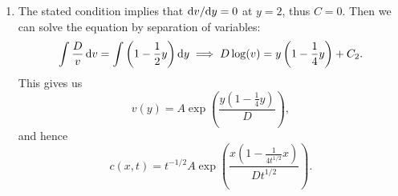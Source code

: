 \documentclass[a4paper, 12pt]{article}
\begin{document}
\begin{enumerate}[label={\bf \arabic{*}.\;}, ref={\arabic{*}},itemsep=3ex, left=0ex]
{\begin{enumerate}[label=(\alph*)]
{          }
        \item{The stated condition implies that $\fd{v}{y}=0$ at $y=2$, thus $C=0$. Then we can solve the equation by separation of variables:
            \begin{equation}
              \int \frac{D}{v} \, {\mathrm d} v = \int \left(1-\frac{1}{2}y\right){\mathrm d}{y} \implies D\log(v) = y\left(1-\frac{1}{4}y\right) + C_2.
            \end{equation}
            This gives us
            \begin{equation}
              v(y)= A\exp\left(\frac{y(1-\frac{1}{4}y)}{D}\right),
            \end{equation}
            and hence
            \begin{equation}
              c(x,t) = t^{-1/2} A\exp\left(\frac{x(1-\frac{1}{4t^{1/2}}x)}{Dt^{1/2}}\right).
            \end{equation}
          }
      \end{enumerate}

    }
\end{enumerate}

%


%
\end{document}
